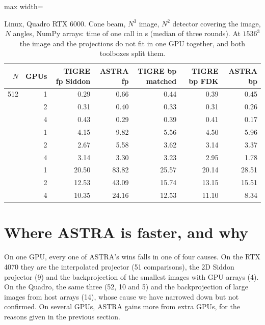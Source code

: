 \documentclass[11pt,a4paper]{article}
\begin{document}
\begin{table}[H]
\centering\small
\caption{Linux, Quadro RTX 6000. Cone beam, $N^3$ image, $N^2$ detector covering the image, $N$ angles, NumPy
arrays: time of one call in s (median of three rounds). At $1536^3$ the image and the projections do not fit in
one GPU together, and both toolboxes split them.}
\label{tab:paper}
\begin{adjustbox}{max width=\linewidth}
\begin{tabular}{rrrrrrr}
\toprule
$N$ & GPUs & TIGRE fp Siddon & ASTRA fp & TIGRE bp matched & TIGRE bp FDK & ASTRA bp \\
\midrule
512 & 1 & 0.29 & 0.66 & 0.44 & 0.39 & 0.45 \\
 & 2 & 0.31 & 0.40 & 0.33 & 0.31 & 0.26 \\
 & 4 & 0.43 & 0.29 & 0.39 & 0.41 & 0.17 \\
\addlinespace[2pt]
1024 & 1 & 4.15 & 9.82 & 5.56 & 4.50 & 5.96 \\
 & 2 & 2.67 & 5.58 & 3.62 & 3.14 & 3.37 \\
 & 4 & 3.14 & 3.30 & 3.23 & 2.95 & 1.78 \\
\addlinespace[2pt]
1536 & 1 & 20.50 & 83.82 & 25.57 & 20.14 & 28.51 \\
 & 2 & 12.53 & 43.09 & 15.74 & 13.15 & 15.51 \\
 & 4 & 10.35 & 24.16 & 12.53 & 11.10 & 8.34 \\
\bottomrule
\end{tabular}
\end{adjustbox}
\end{table}

\section{Where ASTRA is faster, and why}\label{sec:why}
On one GPU, every one of ASTRA's wins falls in one of four causes. On the RTX 4070 they are the interpolated
projector (51 comparisons), the 2D Siddon projector (9) and the backprojection of the smallest images with GPU
arrays (4). On the Quadro, the same three (52, 10 and 5) and the backprojection of large images from host
arrays (14), whose cause we have narrowed down but not confirmed. On several GPUs, ASTRA gains more from extra
GPUs, for the reasons given in the previous section.
\end{document}

